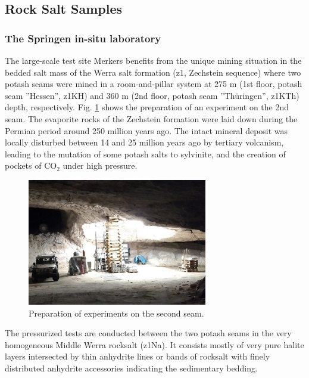 \subsection{Rock Salt Samples}
\label{subsec:salt}

\subsubsection{The Springen in-situ laboratory}
\label{sec:springen}

The large-scale test site Merkers benefits from the unique mining situation in the bedded salt mass of the Werra salt formation (z1, Zechstein sequence) where two potash seams were mined in a room-and-pillar system at 275 m (1st floor, potash seam ''Hessen'', z1KH) and 360 m (2nd floor, potash seam ''Thüringen'', z1KTh) depth, respectively. Fig. \ref{fig:springenlab} shows the preparation of an experiment on the 2nd seam. The evaporite rocks of the Zechstein formation were laid down during the Permian period around 250 million years ago. The intact mineral deposit was locally disturbed between 14 and 25 million years ago by tertiary volcanism, leading to the mutation of some potash salts to sylvinite, and the creation of pockets of CO$_2$ under high pressure.

\begin{figure}
\includegraphics[width=0.7\textwidth]{figures/springen2ndseam.png}
\caption{Preparation of experiments on the second seam.}
\label{fig:springenlab}
\end{figure}

The pressurized tests are conducted between the two potash seams in the very homogeneous Middle Werra rocksalt (z1Na). It consists mostly of very pure halite layers intersected by thin anhydrite lines or bands of rocksalt with finely distributed anhydrite accessories indicating the sedimentary bedding. 

